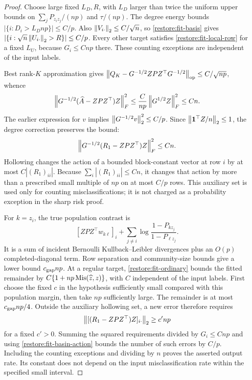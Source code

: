 \begin{proof}
Choose large fixed $L_D,R$, with $L_D$ larger than twice the uniform
upper bounds on $\sum_jP_{z_i z_j}/(np)$ and $\tau/(np)$.
The degree energy bounds $|\{i:D_i>L_Dnp\}|\le C/p$.
Also $\left\lVert V_{i\cdot}\right\rVert_2\le C/\sqrt n$, so
\eqref{restore:fit-basis} gives
$|\{i:\sqrt n\left\lVert U_{i\cdot}\right\rVert_2>R\}|\le C/p$.
Every other target satisfies \eqref{restore:fit-local-row} for a
fixed $L_U$, because $G_i\le Cnp$ there. These counting exceptions
are independent of the input labels.

Best rank-$K$ approximation gives
$\left\lVert Q_K-G^{-1/2}ZPZ^\top G^{-1/2}\right\rVert_{\mathrm{op}}\le C/\sqrt{np}$,
whence
\[
 \left\lVert G^{-1/2}(\widehat A-ZPZ^\top)Z\right\rVert_F^2
 \le \frac{C}{np}\left\lVert G^{1/2}Z\right\rVert_F^2\le Cn.
\]
The earlier expression for $v$ implies
$\left\lVert G^{-1/2}v\right\rVert_2^2\le C/p$.
Since $\left\lVert\mathbf 1^\top Z/n\right\rVert_2\le1$, the degree correction
preserves the bound:
\begin{equation}\label{restore:fit-basin-action}
 \left\lVert G^{-1/2}(R_1-ZPZ^\top)Z\right\rVert_F^2\le Cn.
\end{equation}
Hollowing changes the action of a bounded block-constant vector
at row $i$ by at most $C|(R_1)_{ii}|$.
Because $\sum_i|(R_1)_{ii}|\le Cn$, it changes that action by more
than a prescribed small multiple of $np$ on at most $C/p$ rows.
This auxiliary set is used only for counting misclassifications;
it is not charged as a probability exception in the sharp risk proof.

For $k=z_i$, the true population contrast is
\[
 [ZPZ^\top w_{k\ell}]_i+
       \sum_{j\ne i}\log\frac{1-P_{kz_j}}{1-P_{\ell z_j}}.
\]
It is a sum of incident Bernoulli Kullback--Leibler divergences plus
an $O(p)$ completed-diagonal term. Row separation and community-size
bounds give a lower bound $c_{\rm gap}np$.
At a regular target, \cref{restore:fit-ordinary} bounds the fitted
remainder by $C\{1+np\operatorname{Mis}(\widehat z,z)\}$, with $C$ independent
of the input labels. First choose the fixed $c$ in the hypothesis
sufficiently small compared with this population margin, then take
$np$ sufficiently large. The remainder is at most $c_{\rm gap}np/4$.
Outside the auxiliary hollowing set, a new error therefore requires
\[
 \left\lVert[(R_1-ZPZ^\top)Z]_{i\cdot}\right\rVert_2\ge c'np
\]
for a fixed $c'>0$. Summing the squared requirements divided by
$G_i\le Cnp$ and using \eqref{restore:fit-basin-action} bounds the
number of such errors by $C/p$. Including the counting exceptions
and dividing by $n$ proves the asserted output rate. Its constant
does not depend on the input misclassification rate within the
specified small interval.


\end{proof}
